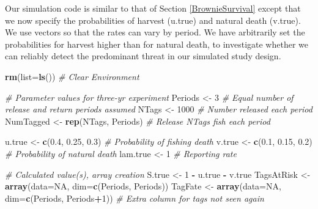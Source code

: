 \documentclass[
]{krantz}
\makeatletter
\newenvironment{Shaded}{\begin{snugshade}}{\end{snugshade}}
\newcommand{\AttributeTok}[1]{\textcolor[rgb]{0.27,0.27,0.27}{#1}}
\newcommand{\CommentTok}[1]{\textcolor[rgb]{0.37,0.37,0.37}{\textit{#1}}}
\newcommand{\ConstantTok}[1]{\textcolor[rgb]{0.37,0.37,0.37}{#1}}
\newcommand{\DecValTok}[1]{\textcolor[rgb]{0.06,0.06,0.06}{#1}}
\newcommand{\FloatTok}[1]{\textcolor[rgb]{0.06,0.06,0.06}{#1}}
\newcommand{\FunctionTok}[1]{\textcolor[rgb]{0.27,0.27,0.27}{\textbf{#1}}}
\newcommand{\NormalTok}[1]{#1}
\newcommand{\OtherTok}[1]{\textcolor[rgb]{0.37,0.37,0.37}{#1}}
\newcommand{\SpecialCharTok}[1]{\textcolor[rgb]{0.43,0.43,0.43}{\textbf{#1}}}
\newenvironment{kframe}{%
\medskip{}
\setlength{\fboxsep}{.8em}
 \def\at@end@of@kframe{}%
 \ifinner\ifhmode%
  \def\at@end@of@kframe{\end{minipage}}%
  \begin{minipage}{\columnwidth}%
 \fi\fi%
 \def\FrameCommand##1{\hskip\@totalleftmargin \hskip-\fboxsep
 \colorbox{shadecolor}{##1}\hskip-\fboxsep
     \hskip-\linewidth \hskip-\@totalleftmargin \hskip\columnwidth}%
 \MakeFramed {\advance\hsize-\width
   \@totalleftmargin\z@ \linewidth\hsize
   \@setminipage}}%
 {\par\unskip\endMakeFramed%
 \at@end@of@kframe}
\renewenvironment{Shaded}{\begin{kframe}}{\end{kframe}}
\makeatother
\begin{document}
Our simulation code is similar to that of Section \ref{BrownieSurvival} except that we now specify the probabilities of harvest (u.true) and natural death (v.true). We use vectors so that the rates can vary by period. We have arbitrarily set the probabilities for harvest higher than for natural death, to investigate whether we can reliably detect the predominant threat in our simulated study design.

\begin{Shaded}
\begin{Highlighting}[]
\FunctionTok{rm}\NormalTok{(}\AttributeTok{list=}\FunctionTok{ls}\NormalTok{()) }\CommentTok{\# Clear Environment}

\CommentTok{\# Parameter values for three{-}yr experiment}
\NormalTok{Periods }\OtherTok{\textless{}{-}} \DecValTok{3}  \CommentTok{\# Equal number of release and return periods assumed}
\NormalTok{NTags }\OtherTok{\textless{}{-}} \DecValTok{1000} \CommentTok{\# Number released each period}
\NormalTok{NumTagged }\OtherTok{\textless{}{-}} \FunctionTok{rep}\NormalTok{(NTags, Periods) }\CommentTok{\# Release NTags fish each period}

\NormalTok{u.true }\OtherTok{\textless{}{-}} \FunctionTok{c}\NormalTok{(}\FloatTok{0.4}\NormalTok{, }\FloatTok{0.25}\NormalTok{, }\FloatTok{0.3}\NormalTok{) }\CommentTok{\# Probability of fishing death}
\NormalTok{v.true }\OtherTok{\textless{}{-}} \FunctionTok{c}\NormalTok{(}\FloatTok{0.1}\NormalTok{, }\FloatTok{0.15}\NormalTok{, }\FloatTok{0.2}\NormalTok{) }\CommentTok{\# Probability of natural death}
\NormalTok{lam.true }\OtherTok{\textless{}{-}} \DecValTok{1}  \CommentTok{\# Reporting rate}

\CommentTok{\# Calculated value(s), array creation}
\NormalTok{S.true }\OtherTok{\textless{}{-}} \DecValTok{1} \SpecialCharTok{{-}}\NormalTok{ u.true }\SpecialCharTok{{-}}\NormalTok{ v.true}
\NormalTok{TagsAtRisk }\OtherTok{\textless{}{-}} \FunctionTok{array}\NormalTok{(}\AttributeTok{data=}\ConstantTok{NA}\NormalTok{, }\AttributeTok{dim=}\FunctionTok{c}\NormalTok{(Periods, Periods))}
\NormalTok{TagFate }\OtherTok{\textless{}{-}} \FunctionTok{array}\NormalTok{(}\AttributeTok{data=}\ConstantTok{NA}\NormalTok{, }\AttributeTok{dim=}\FunctionTok{c}\NormalTok{(Periods, Periods}\SpecialCharTok{+}\DecValTok{1}\NormalTok{))}
  \CommentTok{\# Extra column for tags not seen again}


\end{Highlighting}
\end{Shaded}
\end{document}

